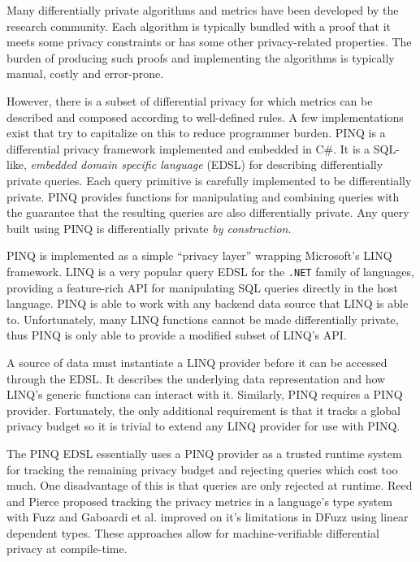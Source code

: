 \documentclass[12pt]{report}
\begin{document}
Many differentially private algorithms and metrics have been developed by the research community.
Each algorithm is typically bundled with a proof that it meets some privacy constraints or has some other privacy-related properties.
The burden of producing such proofs and implementing the algorithms is typically manual, costly and error-prone.

However, there is a subset of differential privacy for which metrics can be described and composed according to well-defined rules.
A few implementations exist that try to capitalize on this to reduce programmer burden.
PINQ\cite{mcsherry2010privacy} is a differential privacy framework implemented and embedded in C\#.
It is a SQL-like, \textit{embedded domain specific language} (EDSL) for describing differentially private queries.
Each query primitive is carefully implemented to be differentially private.
PINQ provides functions for manipulating and combining queries with the guarantee that the resulting queries are also differentially private.
Any query built using PINQ is differentially private \textit{by construction}.

PINQ is implemented as a simple ``privacy layer'' wrapping Microsoft's LINQ framework.
LINQ is a very popular query EDSL for the \texttt{.NET} family of languages, providing a feature-rich API for manipulating SQL queries directly in the host language.
PINQ is able to work with any backend data source that LINQ is able to.
Unfortunately, many LINQ functions cannot be made differentially private, thus PINQ is only able to provide a modified subset of LINQ's API.

A source of data must instantiate a LINQ provider before it can be accessed through the EDSL.
It describes the underlying data representation and how LINQ's generic functions can interact with it.
Similarly, PINQ requires a PINQ provider.
Fortunately, the only additional requirement is that it tracks a global privacy budget so it is trivial to extend any LINQ provider for use with PINQ.

The PINQ EDSL essentially uses a PINQ provider as a trusted runtime system for tracking the remaining privacy budget and rejecting queries which cost too much.
One disadvantage of this is that queries are only rejected at runtime.
Reed and Pierce proposed tracking the privacy metrics in a language's type system with Fuzz\cite{conf/icfp/ReedP10} and Gaboardi et al. improved on it's limitations in DFuzz\cite{conf/popl/GaboardiHHNP13} using linear dependent types.
These approaches allow for machine-verifiable differential privacy at compile-time.
\end{document}
